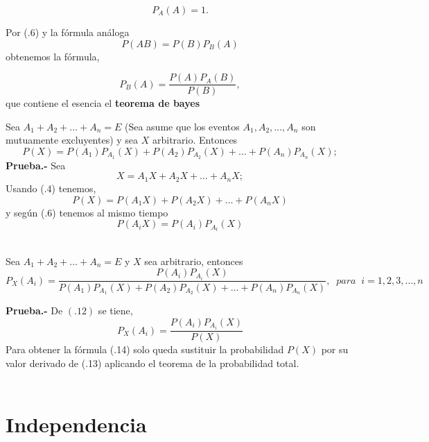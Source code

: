 \begin{equation}
    P_A(A)=1.
\end{equation}

Por (.6) y la fórmula análoga $$P(AB)=P(B)P_B(A)$$
obtenemos la fórmula,

\begin{tcolorbox}[colframe=white]
    \begin{equation}
	P_B(A) = \dfrac{P(A)P_A(B)}{P(B)},
    \end{equation}
    que contiene el esencia el \textbf{teorema de bayes}
\end{tcolorbox}

    \begin{teo} Sea $A_1+A_2+\ldots + A_n = E$ (Sea asume que los eventos $A_1,A_2,\ldots,A_n$ son mutuamente excluyentes) y sea $X$ arbitrario. Entonces 
	\begin{equation}
	    P(X)=P(A_1)P_{A_1}(X) + P(A_2)P_{A_2}(X)+\ldots + P(A_n)P_{A_n}(X);
	\end{equation}
	\vspace{.5cm}
	\textbf{Prueba.-}\; Sea $$X=A_1 X + A_2X + \ldots + A_n X;$$
Usando (.4) tenemos, $$P(X)=P(A_1X)+P(A_2X)+\ldots + P(A_nX)$$
y según (.6) tenemos al mismo tiempo
$$P(A_iX)=P(A_i)P_{A_t}(X)$$\\
    \end{teo}

    \begin{teo}
	Sea $A_1+A_2+\ldots + A_n = E$ y $X$ sea arbitrario, entonces 
	\begin{equation}
	    P_X(A_i) = \dfrac{P(A_i)P_{A_i}(X)}{P(A_1)P_{A_1}(X) + P(A_2)P_{A_2}(X)+\ldots + P(A_n)P_{A_n}(X)}, \; \; para \;\; i=1,2,3,\ldots,n 
	\end{equation}

	\vspace{.5cm}

	\textbf{Prueba.-}\; De $(.12)$ se tiene, $$P_X(A_i) = \dfrac{P(A_i) P_{A_i}(X)}{P(X)}$$
	Para obtener la fórmula (.14) solo queda sustituir la probabilidad $P(X)$ por su valor derivado de (.13) aplicando el teorema de la probabilidad total.\\\\
    \end{teo}

\section{Independencia}
